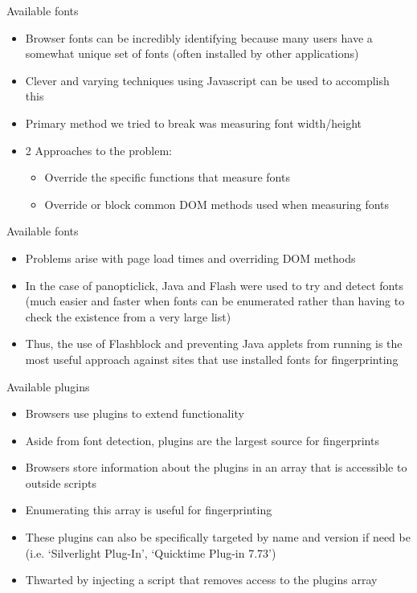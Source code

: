 \begin{frame}[fragile,t]{Available fonts}
	\begin{itemize}
		\item Browser fonts can be incredibly identifying because many users have a somewhat unique set of fonts (often installed by other applications)
		\item Clever and varying techniques using Javascript can be used to accomplish this
		\item Primary method we tried to break was measuring font width/height
		\item 2 Approaches to the problem:
			\begin{itemize}
				\item Override the specific functions that measure fonts
				\item Override or block common DOM methods used when measuring fonts
			\end{itemize}
	\end{itemize}
\end{frame}

\begin{frame}[fragile,t]{Available fonts}
	\begin{itemize}
		\item Problems arise with page load times and overriding DOM methods
		\item In the case of panopticlick, Java and Flash were used to try and detect fonts (much easier and faster when fonts can be enumerated rather than having to check the existence from a very large list)
		\item Thus, the use of Flashblock and preventing Java applets from running is the most useful approach against sites that use installed fonts for fingerprinting
	\end{itemize}
\end{frame}

\begin{frame}[fragile,t]{Available plugins}
	\begin{itemize}
		\item Browsers use plugins to extend functionality
		\item Aside from font detection, plugins are the largest source for fingerprints
		\item Browsers store information about the plugins in an array that is accessible to outside scripts
		\item Enumerating this array is useful for fingerprinting
		\item These plugins can also be specifically targeted by name and version if need be (i.e. `Silverlight Plug-In', `Quicktime Plug-in 7.73')
		\item Thwarted by injecting a script that removes access to the plugins array
	\end{itemize}
\end{frame}

